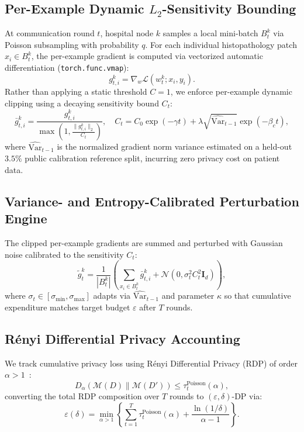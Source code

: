 \documentclass{ieeeaccess}
\begin{document}
\subsection{Per-Example Dynamic $L_2$-Sensitivity Bounding}
At communication round $t$, hospital node $k$ samples a local mini-batch $B_t^k$ via Poisson subsampling with probability $q$. For each individual histopathology patch $x_i \in B_t^k$, the per-example gradient is computed via vectorized automatic differentiation (\texttt{torch.func.vmap}):
\begin{equation}
g_{t,i}^k = \nabla_w \mathcal{L}(w_t^k; x_i, y_i).
\label{eq:per_example_grad}
\end{equation}
Rather than applying a static threshold $C=1$, we enforce per-example dynamic clipping using a decaying sensitivity bound $C_t$:
\begin{equation}
\bar{g}_{t,i}^k = \frac{g_{t,i}^k}{\max\left(1, \frac{\|g_{t,i}^k\|_2}{C_t}\right)}, \quad C_t = C_0 \exp(-\gamma t) + \lambda \sqrt{\widehat{\text{Var}}_{t-1}} \exp(-\beta_c t),
\label{eq:dynamic_clip}
\end{equation}
where $\widehat{\text{Var}}_{t-1}$ is the normalized gradient norm variance estimated on a held-out $3.5\%$ public calibration reference split, incurring zero privacy cost on patient data.

\subsection{Variance- and Entropy-Calibrated Perturbation Engine}
The clipped per-example gradients are summed and perturbed with Gaussian noise calibrated to the sensitivity $C_t$:
\begin{equation}
\tilde{g}_t^k = \frac{1}{|B_t^k|} \left( \sum_{x_i \in B_t^k} \bar{g}_{t,i}^k + \mathcal{N}\left(0, \sigma_t^2 C_t^2 \mathbf{I}_d\right) \right),
\label{eq:noisy_batch}
\end{equation}
where $\sigma_t \in [\sigma_{\min}, \sigma_{\max}]$ adapts via $\widehat{\text{Var}}_{t-1}$ and parameter $\kappa$ so that cumulative expenditure matches target budget $\varepsilon$ after $T$ rounds.

\subsection{R\'enyi Differential Privacy Accounting}
We track cumulative privacy loss using R\'enyi Differential Privacy (RDP) of order $\alpha > 1$~\cite{ref6,ref16,ref18}:
\begin{equation}
D_{\alpha}(\mathcal{M}(D) \parallel \mathcal{M}(D')) \le \tau_t^{\text{Poisson}}(\alpha),
\label{eq:rdp_step}
\end{equation}
converting the total RDP composition over $T$ rounds to $(\varepsilon, \delta)$-DP via:
\begin{equation}
\varepsilon(\delta) = \min_{\alpha > 1} \left\{ \sum_{t=1}^{T} \tau_t^{\text{Poisson}}(\alpha) + \frac{\ln(1/\delta)}{\alpha - 1} \right\}.
\label{eq:rdp_to_dp}
\end{equation}
\end{document}
